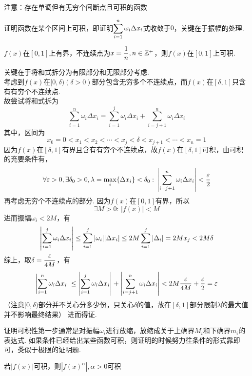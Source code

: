 \par 注意：存在单调但有无穷个间断点且可积的函数
\par 证明函数在某个区间上可积，即证明$\displaystyle\sum_{i=1}^n\omega_i\Delta x_i$式收敛于$0$，关键在于振幅的处理.
\begin{example}
$f(x)$在$[0,1]$上有界，不连续点为$x=\dfrac{1}{n},n\in\mathbb{Z}^+$，则$f(x)$在$[0,1]$上可积.
\end{example}
\begin{analysis}
关键在于将和式拆分为有限部分和无限部分考虑.\\
考虑到$f(x)$在$[0,\delta)(\delta>0)$部分包含无穷多个不连续点，而$f(x)$在$[\delta,1]$只含有有穷个不连续点.\\
故尝试将和式拆为
\[\sum_{i=1}^n\omega_i\Delta x_i=\sum_{i=1}^j\omega_i\Delta x_i+\sum_{i=j+1}^n\omega_i\Delta x_i\]
其中，区间为
\[x_0=0<x_1<x_2<\cdots<x_j<\delta<x_{j+1}<\cdots<x_n=1\]
因为$f(x)$在$[\delta,1]$有界且含有有穷个不连续点，故$f(x)$在$[\delta,1]$可积，由可积的充要条件有，
\[\forall\varepsilon>0,\exists\delta_0>0,\lambda=\max_i\{\Delta x_i\}<\delta_0:\,\left|\sum_{i=j+1}^n\omega_i\Delta x_i\right|<\dfrac{\varepsilon}{2}\]
再考虑无穷个不连续点的部分. 因为$f(x)$在$[0,1]$有界，所以
\[\exists M>0:\,|f(x)|<M\]
进而振幅$\omega_i<2M$，有
\[\left|\sum_{i=1}^j\omega_i\Delta x_i\right|\leq\sum_{i=1}^j|\omega_i||\Delta x_i|\leq 2M\sum_{i=1}^j|\Delta_i|=2Mx_j<2M\delta\]
综上，取$\delta=\dfrac{\varepsilon}{4M}$，有
\[\left|\sum_{i=1}^n\omega_i\Delta x_i\right|\leq\left|\sum_{i=1}^j\omega_i\Delta x_i\right|+\left|\sum_{i=j+1}^n\omega_i\Delta x_i\right|<2M\dfrac{\varepsilon}{4M}+\dfrac{\varepsilon}{2}=\varepsilon\]
（注意$[0,\delta)$部分并不关心分多少份，只关心$\delta$的值，故在$[\delta,1]$部分限制$\lambda$的最大值并不影响最终结果）
进而得证.
\end{analysis}
\par 证明可积性第一步通常是对振幅$\omega_i$进行放缩，放缩成关于上确界$M_i$和下确界$m_i$的表达式.
如果条件已经给出某些函数可积，则证明的时候努力往条件的形式靠即可，类似于极限的证明题.
\begin{example}
\label{ex:f_f2_absf_relation_lemma}
若$|f(x)|$可积，则$|f(x)^\alpha|,\alpha>0$可积
\end{example}
